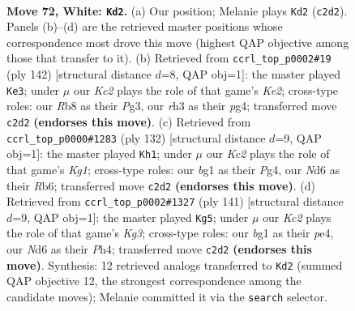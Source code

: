 \documentclass[11pt]{article}
\begin{document}
\clearpage

\begin{figure}[p]\centering
\begin{subfigure}{0.46\textwidth}\centering
\resizebox{\linewidth}{!}{%
\newchessgame
\chessboard[
  setfen={1R6/8/3Nn1k1/P7/8/7r/2K5/6b1 w - - 11 72},
  showmover=false,
  pgfstyle=straightmove, color=movearrow, markmove={c2-d2}
]}
\caption{}
\end{subfigure}\hfill
\begin{subfigure}{0.46\textwidth}\centering
\resizebox{\linewidth}{!}{%
\newchessgame
\chessboard[
  setfen={7n/7P/5k2/2N5/6p1/6P1/4K3/8 w - - 11 72},
  showmover=false,
  pgfstyle=straightmove, color=movearrow, markmove={e2-e3}
]}
\caption{}
\end{subfigure}
\\[4pt]
\begin{subfigure}{0.46\textwidth}\centering
\resizebox{\linewidth}{!}{%
\newchessgame
\chessboard[
  setfen={8/5k2/1R6/6p1/6P1/8/3r4/6K1 w - - 5 67},
  showmover=false,
  pgfstyle=straightmove, color=movearrow, markmove={g1-h1}
]}
\caption{}
\end{subfigure}\hfill
\begin{subfigure}{0.46\textwidth}\centering
\resizebox{\linewidth}{!}{%
\newchessgame
\chessboard[
  setfen={8/R7/6k1/8/4P2p/2r5/5K2/8 b - - 3 71},
  showmover=false,
  pgfstyle=straightmove, color=movearrow, markmove={g6-g5}
]}
\caption{}
\end{subfigure}
\caption{\textbf{Move 72, White: \texttt{Kd2}.} (a) Our position; Melanie plays \texttt{Kd2} (\texttt{c2d2}). Panels (b)--(d) are the retrieved master positions whose correspondence most drove this move (highest QAP objective among those that transfer to it). (b) Retrieved from \texttt{ccrl\_top\_p0002\#19} (ply 142) [structural distance $d$=8, QAP obj=1]: the master played \texttt{Ke3}; under $\mu$ our \emph{Kc2} plays the role of that game's \emph{Ke2}; cross-type roles: our \emph{R}b8 as their \emph{P}g3, our \emph{r}h3 as their \emph{p}g4; transferred move \texttt{c2d2} \textbf{(endorses this move)}. (c) Retrieved from \texttt{ccrl\_top\_p0000\#1283} (ply 132) [structural distance $d$=9, QAP obj=1]: the master played \texttt{Kh1}; under $\mu$ our \emph{Kc2} plays the role of that game's \emph{Kg1}; cross-type roles: our \emph{b}g1 as their \emph{P}g4, our \emph{N}d6 as their \emph{R}b6; transferred move \texttt{c2d2} \textbf{(endorses this move)}. (d) Retrieved from \texttt{ccrl\_top\_p0002\#1327} (ply 141) [structural distance $d$=9, QAP obj=1]: the master played \texttt{Kg5}; under $\mu$ our \emph{Kc2} plays the role of that game's \emph{Kg3}; cross-type roles: our \emph{b}g1 as their \emph{p}e4, our \emph{N}d6 as their \emph{P}h4; transferred move \texttt{c2d2} \textbf{(endorses this move)}. Synthesis: 12 retrieved analogs transferred to \texttt{Kd2} (summed QAP objective 12, the strongest correspondence among the candidate moves); Melanie committed it via the \texttt{search} selector.}
\label{fig:thought-m142}
\end{figure}
\end{document}

